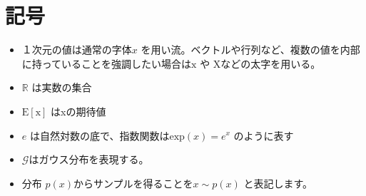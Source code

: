 \chapter*{記号}
\label{thanks}


\begin{itemize}
    \item １次元の値は通常の字体$ x $ を用い流。ベクトルや行列など、複数の値を内部に持っていることを強調したい場合は$ \mathrm{x} $ や $ \mathrm{X} $などの太字を用いる。
    \item $\mathbb{R}$ は実数の集合
    \item $\mathrm{E[x]}$ はxの期待値
    \item $e$ は自然対数の底で、指数関数は$\mathrm{exp}(x) = e^x$ のように表す
    \item $ \mathcal{G} $はガウス分布を表現する。
    \item 分布 $p(x)$からサンプルを得ることを$ x \sim p(x) $ と表記します。

\end{itemize}